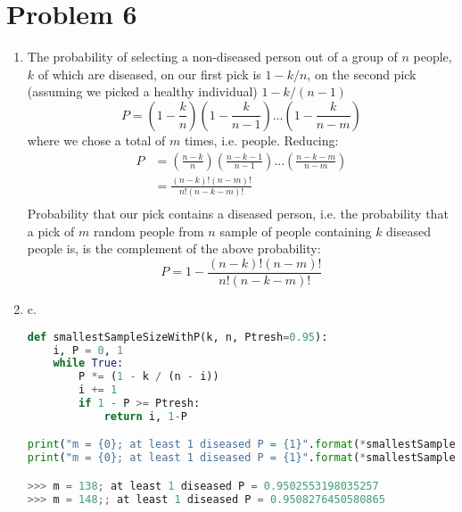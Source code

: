 \documentclass{article}
\newcommand{\1}{\mathbf{1}}
\begin{document}
\newpage
\section*{Problem 6}
\begin{enumerate}
	\item The probability of selecting a non-diseased person out of a group of $n$ people, $k$ of which are diseased, on our first pick is $1 - k/n$, on the second pick (assuming we picked a healthy individual) $1-k/(n-1)$
	$$P = \left(1 - \frac{k}{n}\right) \left(1 - \frac{k}{n-1}\right) \dots \left(1 - \frac{k}{n-m}\right) $$
	where we chose a total of $m$ times, i.e. people. Reducing:
	\begin{align*}
    P &= \left(\frac{n-k}{n}\right) \left(\frac{n-k-1}{n-1}\right) \dots \left(\frac{n-k-m}{n-m}\right) \\
      &= \frac{(n-k)!(n-m)!}{n!(n-k-m)!} \\
    \end{align*}
    Probability that our pick contains a diseased person, i.e. the probability that a pick of $m$ random people from $n$ sample of people containing $k$ diseased people is, is the complement of the above probability:
    $$P = 1- \frac{(n-k)!(n-m)!}{n!(n-k-m)!}$$
    \item \addtocounter{enumi}{1} c.
        \begin{lstlisting}[language=Python]
def smallestSampleSizeWithP(k, n, Ptresh=0.95):
    i, P = 0, 1
    while True:
        P *= (1 - k / (n - i))
        i += 1
        if 1 - P >= Ptresh:
            return i, 1-P

print("m = {0}; at least 1 diseased P = {1}".format(*smallestSampleSizeWithP(20, 1000)))
print("m = {0}; at least 1 diseased P = {1}".format(*smallestSampleSizeWithP(200, 10000)))

>>> m = 138; at least 1 diseased P = 0.9502553198035257
>>> m = 148;; at least 1 diseased P = 0.9508276450580865
        \end{lstlisting}
    

\end{enumerate}
\end{document}
